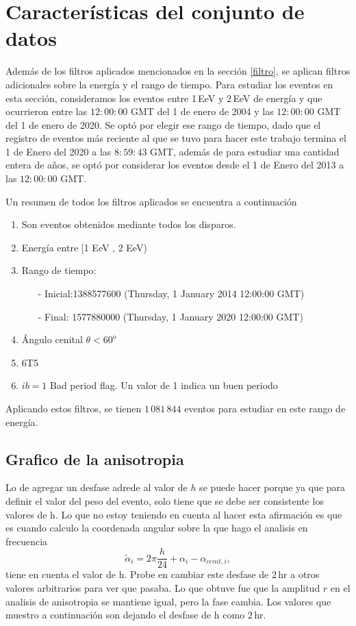 	\section{Características del conjunto de datos} \label{specs}
	

	Además de los filtros aplicados mencionados en la sección \ref{filtro}, se aplican filtros adicionales sobre la energía y el rango de tiempo. Para estudiar los eventos en esta sección, consideramos los eventos entre 1\,EeV y 2\,EeV de energía y que ocurrieron entre las $12:00:00$ GMT del 1 de enero de 2004 y las $12:00:00$ GMT del 1 de enero de 2020. Se optó por elegir ese rango de tiempo, dado que el registro de eventos más reciente al que se tuvo para hacer este trabajo termina el 1 de Enero del 2020   a las $8:59:43$ GMT, además de para estudiar una cantidad entera de años, se optó por considerar los eventos desde el 1 de Enero del 2013 a las $12:00:00 $ GMT.

	Un resumen de todos los filtros aplicados se encuentra a continuación
		\begin{enumerate}
			\item Son eventos obtenidos mediante todos los disparos.
			\item Energía entre  [1 EeV , 2 EeV)
			\item Rango de tiempo:
			\begin{itemize}
				\item[-] Inicial:1388577600 (Thursday, 1 January 2014 12:00:00 GMT)
				\item[-] Final: 1577880000  (Thursday, 1 January 2020 12:00:00 GMT)
			\end{itemize}
			\item Ángulo cenital $\theta < 60^o$
			\item 6T5
			\item $ib=1$ Bad period flag. Un valor de 1 indica un buen periodo
		\end{enumerate}
	Aplicando estos filtros, se tienen $1\,081\,844$ eventos para estudiar en este rango de energía.





\subsection{Grafico de la anisotropia}


		Lo de agregar un desfase adrede al valor de $h$ se puede hacer porque ya que para definir el valor del peso del evento, solo tiene que se debe ser consistente los valores  de h. Lo que no estoy teniendo en cuenta al hacer esta afirmación es que es cuando calculo la coordenada angular sobre la que hago el analisis en frecuencia
		\begin{equation}
			   \tilde{\alpha}_i = 2\pi \frac{h}{24} + \alpha_i -\alpha_{cenit,i},
		\end{equation}
		tiene en cuenta el valor de h. Probe en cambiar este desfase de $2\,$hr a otros valores arbitrarios para ver que pasaba. Lo que obtuve fue que la amplitud $r$ en el analisis de anisotropia se mantiene igual, pero la fase cambia. Los valores que muestro a continuación son dejando el desfase de h como $2\,$hr.
		
